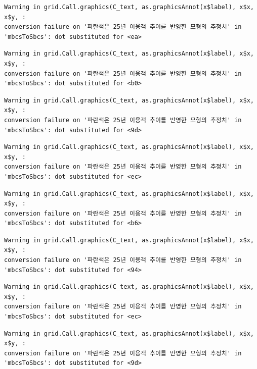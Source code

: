 \documentclass[
  letterpaper,
  DIV=11,
  numbers=noendperiod]{scrreprt}
\begin{document}
\begin{verbatim}
Warning in grid.Call.graphics(C_text, as.graphicsAnnot(x$label), x$x, x$y, :
conversion failure on '파란색은 25년 이용객 추이를 반영한 모형의 추정치' in
'mbcsToSbcs': dot substituted for <ea>
\end{verbatim}

\begin{verbatim}
Warning in grid.Call.graphics(C_text, as.graphicsAnnot(x$label), x$x, x$y, :
conversion failure on '파란색은 25년 이용객 추이를 반영한 모형의 추정치' in
'mbcsToSbcs': dot substituted for <b0>
\end{verbatim}

\begin{verbatim}
Warning in grid.Call.graphics(C_text, as.graphicsAnnot(x$label), x$x, x$y, :
conversion failure on '파란색은 25년 이용객 추이를 반영한 모형의 추정치' in
'mbcsToSbcs': dot substituted for <9d>
\end{verbatim}

\begin{verbatim}
Warning in grid.Call.graphics(C_text, as.graphicsAnnot(x$label), x$x, x$y, :
conversion failure on '파란색은 25년 이용객 추이를 반영한 모형의 추정치' in
'mbcsToSbcs': dot substituted for <ec>
\end{verbatim}

\begin{verbatim}
Warning in grid.Call.graphics(C_text, as.graphicsAnnot(x$label), x$x, x$y, :
conversion failure on '파란색은 25년 이용객 추이를 반영한 모형의 추정치' in
'mbcsToSbcs': dot substituted for <b6>
\end{verbatim}

\begin{verbatim}
Warning in grid.Call.graphics(C_text, as.graphicsAnnot(x$label), x$x, x$y, :
conversion failure on '파란색은 25년 이용객 추이를 반영한 모형의 추정치' in
'mbcsToSbcs': dot substituted for <94>
\end{verbatim}

\begin{verbatim}
Warning in grid.Call.graphics(C_text, as.graphicsAnnot(x$label), x$x, x$y, :
conversion failure on '파란색은 25년 이용객 추이를 반영한 모형의 추정치' in
'mbcsToSbcs': dot substituted for <ec>
\end{verbatim}

\begin{verbatim}
Warning in grid.Call.graphics(C_text, as.graphicsAnnot(x$label), x$x, x$y, :
conversion failure on '파란색은 25년 이용객 추이를 반영한 모형의 추정치' in
'mbcsToSbcs': dot substituted for <9d>
\end{verbatim}
\end{document}
